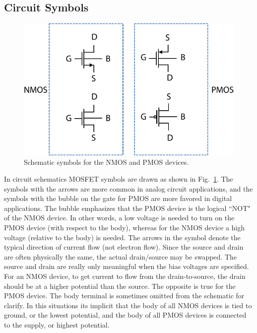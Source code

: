 \subsection{Circuit Symbols}
\begin{figure}[tb]
\centering
\includegraphics[width=.6\columnwidth]{mos_symbols}
\caption{Schematic symbols for the NMOS and PMOS devices.}
\label{fig:mos_symbols}
\end{figure}
In circuit schematics MOSFET symbols are drawn as shown in Fig.~\ref{fig:mos_symbols}.  The symbols with the arrows are more common in analog circuit applications, and the symbols with the bubble on the gate for PMOS are more favored in digital applications.  The bubble emphasizes that the PMOS device is the logical ``NOT" of the NMOS device. In other words, a low voltage is needed to turn on the PMOS device (with respect to the body), whereas for the NMOS device a high voltage (relative to the body) is needed.  The arrows in the symbol denote the typical direction of current flow (not electron flow).  Since the source and drain are often physically the same, the actual drain/source may be swapped.  The source and drain are really only meaningful when the bias voltages are specified. For an NMOS device, to get current to flow from the drain-to-source, the drain should be at a higher potential than the source.  The opposite is true for the PMOS device.
The body terminal is sometimes omitted from the schematic for clarify.  In this situations its implicit that the body of all NMOS devices is tied to ground, or the lowest potential, and the body of all PMOS devices is connected to the supply, or highest potential.
